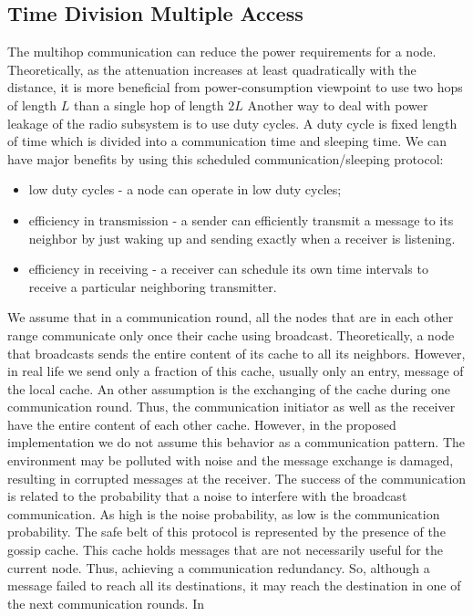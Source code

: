 \documentclass[a4paper,8pt]{report}
\begin{document}
\subsection{Time Division Multiple Access}
The multihop communication can reduce the power requirements for a
node. Theoretically, as the attenuation increases at least
quadratically with the distance, it is more beneficial from
power-consumption viewpoint to use two hops of length $L$ than a
single hop of length $2L$ Another way to deal with power leakage of
the radio subsystem is to use duty cycles. A duty cycle is fixed
length of time which is divided into a communication time and
sleeping time. We can have major benefits by using this scheduled
communication/sleeping protocol:
\begin{itemize}
 \item low duty cycles - a node can operate in low duty cycles;
\item efficiency in transmission - a sender can efficiently transmit a message to its
neighbor by just waking up and sending exactly when a receiver is
listening.
 \item efficiency in receiving - a receiver can schedule
its own time intervals to receive a particular neighboring
transmitter. \end{itemize} We assume that in a communication round,
all the nodes that are in each other range communicate only once
their cache using broadcast. Theoretically, a node that broadcasts
sends the entire content of its cache to all its neighbors. However,
in real life we send only a fraction of this cache, usually only an
entry, message of the local cache. An other assumption is the
exchanging of the cache during one communication round. Thus, the
communication initiator as well as the receiver have the entire
content of each other cache. However, in the proposed implementation
we do not assume this behavior as a communication pattern. The
environment may be polluted with noise and the message exchange is
damaged, resulting in corrupted messages at the receiver. The
success of the communication is related to the probability that a
noise to interfere with the broadcast communication. As high is the
noise probability, as low is the communication probability. The safe
belt of this protocol is represented by the presence of the gossip
cache. This cache holds messages that are not necessarily useful for
the current node. Thus, achieving a communication redundancy. So,
although a message failed to reach all its destinations, it may
reach the destination in one of the next communication rounds. In
\end{document}

